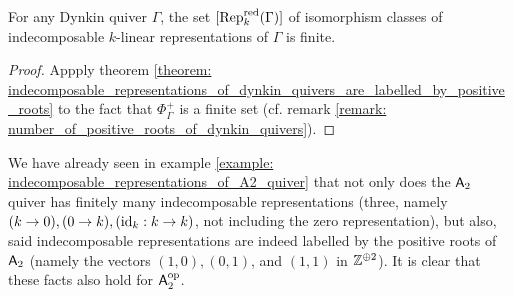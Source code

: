             \begin{corollary} \label{coro: dynkin_quivers_are_representation_finite}
                For any Dynkin quiver $\Gamma$, the set $[\mathrm{Rep}_k^{\mathrm{red}}(\Gamma)]$ of isomorphism classes of indecomposable $k$-linear representations of $\Gamma$ is finite. 
            \end{corollary}
                \begin{proof}
                    Appply theorem \ref{theorem: indecomposable_representations_of_dynkin_quivers_are_labelled_by_positive_roots} to the fact that $\Phi_{\Gamma}^+$ is a finite set (cf. remark \ref{remark: number_of_positive_roots_of_dynkin_quivers}).
                \end{proof}
            
            \begin{example}
                We have already seen in example \ref{example: indecomposable_representations_of_A2_quiver} that not only does the $\mathsf{A}_2$ quiver has finitely many indecomposable representations (three, namely $(k \to 0), (0 \to k), (\mathrm{id}_k: k \to k)$, not including the zero representation), but also, said indecomposable representations are indeed labelled by the positive roots of $\mathsf{A}_2$ (namely the vectors $(1, 0), (0, 1)$, and $(1, 1)$ in $\mathbb{Z}^{\oplus 2}$). It is clear that these facts also hold for $\mathsf{A}_2^{\mathrm{op}}$. 
                

\end{example}

